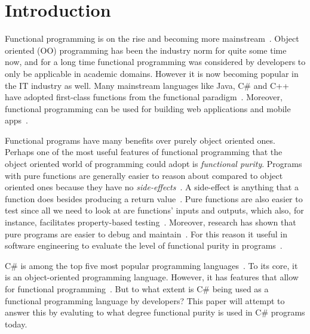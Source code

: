 \documentclass[a4paper,12pt]{article}
\begin{document}
\tableofcontents


\cleardoublepage

\mainmatter

\section{Introduction} \label{sec:Introduction}

Functional programming is on the rise and becoming more mainstream~\cite{intertech}. Object oriented (OO) programming has been the industry norm for quite some time now, and for a long time functional programming was considered by developers to only be applicable in academic domains. However it is now becoming popular in the IT industry as well. Many mainstream languages like Java, C\# and C++ have adopted first-class functions from the functional paradigm~\cite{intertech}. Moreover, functional programming can be used for building web applications and mobile apps~\cite{jonas-walter}.

Functional programs have many benefits over purely object oriented ones. Perhaps one of the most useful features of functional programming that the object oriented world of programming could adopt is \textit{functional purity}. Programs with pure functions are generally easier to reason about compared to object oriented ones because they have no \textit{side-effects}~\cite{alvin-alexander}. A side-effect is anything that a function does besides producing a return value~\cite{purity-in-javascript}. Pure functions are also easier to test since all we need to look at are functions' inputs and outputs, which also, for instance, facilitates property-based testing~\cite{alvin-alexander}. Moreover, research has shown that pure programs are easier to debug and maintain~\cite{purity-in-javascript}. %
For this reason it useful in software engineering to evaluate the level of functional purity in programs~\cite{purity-in-javascript}.

C\# is among the top five most popular programming languages~\cite{tiobe}. To its core, it is an object-oriented programming language. However, it has features that allow for functional programming~\cite{hamid-mosalla}. But to what extent is C\# being used as a functional programming language by developers? This paper will attempt to answer this by evaluting to what degree functional purity is used in C\# programs today.
\end{document}
